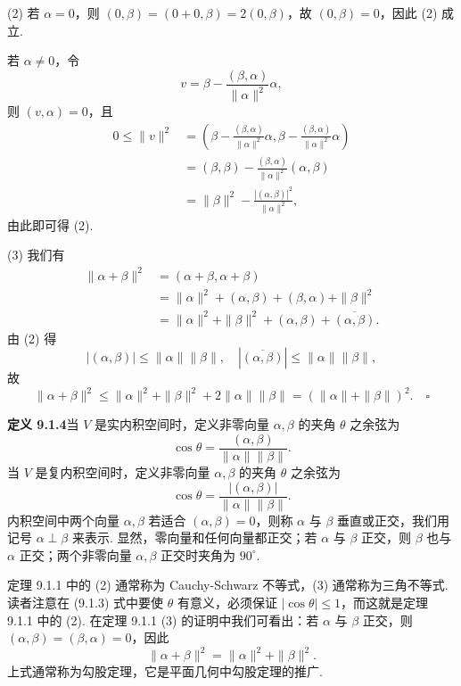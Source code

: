 \documentclass[UTF8,12pt,a4paper,fontset=fandol]{ctexart}
\begin{document}
(2) 若 $\alpha=0$，则 $(0,\beta)=(0+0,\beta)=2(0,\beta)$，故 $(0,\beta)=0$，因此 (2) 成立.

若 $\alpha\ne0$，令
\[
  v=\beta-\frac{(\beta,\alpha)}{\|\alpha\|^2}\alpha,
\]
则 $(v,\alpha)=0$，且
\[
\begin{aligned}
  0\le \|v\|^2
  &=
  \left(\beta-\frac{(\beta,\alpha)}{\|\alpha\|^2}\alpha,
  \beta-\frac{(\beta,\alpha)}{\|\alpha\|^2}\alpha\right)\\
  &=(\beta,\beta)-\frac{(\beta,\alpha)}{\|\alpha\|^2}(\alpha,\beta)\\
  &=\|\beta\|^2-\frac{|(\alpha,\beta)|^2}{\|\alpha\|^2},
\end{aligned}
\]
由此即可得 (2).

(3) 我们有
\[
\begin{aligned}
  \|\alpha+\beta\|^2
  &=(\alpha+\beta,\alpha+\beta)\\
  &=\|\alpha\|^2+(\alpha,\beta)+(\beta,\alpha)+\|\beta\|^2\\
  &=\|\alpha\|^2+\|\beta\|^2+(\alpha,\beta)+\overline{(\alpha,\beta)}.
\end{aligned}
\]
由 (2) 得
\[
  |(\alpha,\beta)|\le \|\alpha\|\|\beta\|,
  \quad
  |\overline{(\alpha,\beta)}|\le \|\alpha\|\|\beta\|,
\]
故
\[
  \|\alpha+\beta\|^2\le \|\alpha\|^2+\|\beta\|^2+2\|\alpha\|\|\beta\|=(\|\alpha\|+\|\beta\|)^2. \quad \square
\]

\noindent\textbf{定义 9.1.4}\quad 当 $V$ 是实内积空间时，定义非零向量 $\alpha,\beta$ 的夹角 $\theta$ 之余弦为
\begin{equation}
  \cos\theta=\frac{(\alpha,\beta)}{\|\alpha\|\|\beta\|}.
  \tag{9.1.3}
\end{equation}
当 $V$ 是复内积空间时，定义非零向量 $\alpha,\beta$ 的夹角 $\theta$ 之余弦为
\[
  \cos\theta=\frac{|(\alpha,\beta)|}{\|\alpha\|\|\beta\|}.
\]
内积空间中两个向量 $\alpha,\beta$ 若适合 $(\alpha,\beta)=0$，则称 $\alpha$ 与 $\beta$ 垂直或正交，我们用记号 $\alpha\perp\beta$ 来表示. 显然，零向量和任何向量都正交；若 $\alpha$ 与 $\beta$ 正交，则 $\beta$ 也与 $\alpha$ 正交；两个非零向量 $\alpha,\beta$ 正交时夹角为 $90^\circ$.

定理 9.1.1 中的 (2) 通常称为 Cauchy-Schwarz 不等式，(3) 通常称为三角不等式. 读者注意在 (9.1.3) 式中要使 $\theta$ 有意义，必须保证 $|\cos\theta|\le1$，而这就是定理 9.1.1 中的 (2). 在定理 9.1.1 (3) 的证明中我们可看出：若 $\alpha$ 与 $\beta$ 正交，则 $(\alpha,\beta)=(\beta,\alpha)=0$，因此
\begin{equation}
  \|\alpha+\beta\|^2=\|\alpha\|^2+\|\beta\|^2.
  \tag{9.1.4}
\end{equation}
上式通常称为勾股定理，它是平面几何中勾股定理的推广.
\end{document}
